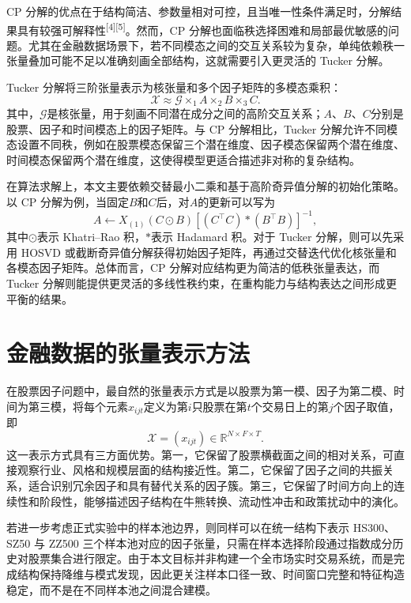CP 分解的优点在于结构简洁、参数量相对可控，且当唯一性条件满足时，分解结果具有较强可解释性\textsuperscript{[4][5]}。然而，CP 分解也面临秩选择困难和局部最优敏感的问题。尤其在金融数据场景下，若不同模态之间的交互关系较为复杂，单纯依赖秩一张量叠加可能不足以准确刻画全部结构，这就需要引入更灵活的 Tucker 分解。

Tucker 分解将三阶张量表示为核张量和多个因子矩阵的多模态乘积：
\begin{equation}
\mathcal{X}\approx \mathcal{G}\times_1 A\times_2 B\times_3 C.
\end{equation}
其中，$\mathcal{G}$是核张量，用于刻画不同潜在成分之间的高阶交互关系；$A$、$B$、$C$分别是股票、因子和时间模态上的因子矩阵。与 CP 分解相比，Tucker 分解允许不同模态设置不同秩，例如在股票模态保留三个潜在维度、因子模态保留两个潜在维度、时间模态保留两个潜在维度，这使得模型更适合描述非对称的复杂结构。

在算法求解上，本文主要依赖交替最小二乘和基于高阶奇异值分解的初始化策略。以 CP 分解为例，当固定$B$和$C$后，对$A$的更新可以写为
\begin{equation}
A\leftarrow X_{(1)}(C\odot B)\left[(C^{\top}C)\ast(B^{\top}B)\right]^{-1},
\end{equation}
其中$\odot$表示 Khatri--Rao 积，$\ast$表示 Hadamard 积。对于 Tucker 分解，则可以先采用 HOSVD 或截断奇异值分解获得初始因子矩阵，再通过交替迭代优化核张量和各模态因子矩阵。总体而言，CP 分解对应结构更为简洁的低秩张量表达，而 Tucker 分解则能提供更灵活的多线性秩约束，在重构能力与结构表达之间形成更平衡的结果。

\section{金融数据的张量表示方法}

在股票因子问题中，最自然的张量表示方式是以股票为第一模、因子为第二模、时间为第三模，将每个元素$x_{ijt}$定义为第$i$只股票在第$t$个交易日上的第$j$个因子取值，即
\begin{equation}
\mathcal{X}=(x_{ijt})\in\mathbb{R}^{N\times F\times T}.
\end{equation}
这一表示方式具有三方面优势。第一，它保留了股票横截面之间的相对关系，可直接观察行业、风格和规模层面的结构接近性。第二，它保留了因子之间的共振关系，适合识别冗余因子和具有替代关系的因子簇。第三，它保留了时间方向上的连续性和阶段性，能够描述因子结构在牛熊转换、流动性冲击和政策扰动中的演化。

若进一步考虑正式实验中的样本池边界，则同样可以在统一结构下表示 HS300、SZ50 与 ZZ500 三个样本池对应的因子张量，只需在样本选择阶段通过指数成分历史对股票集合进行限定。由于本文目标并非构建一个全市场实时交易系统，而是完成结构保持降维与模式发现，因此更关注样本口径一致、时间窗口完整和特征构造稳定，而不是在不同样本池之间混合建模。

